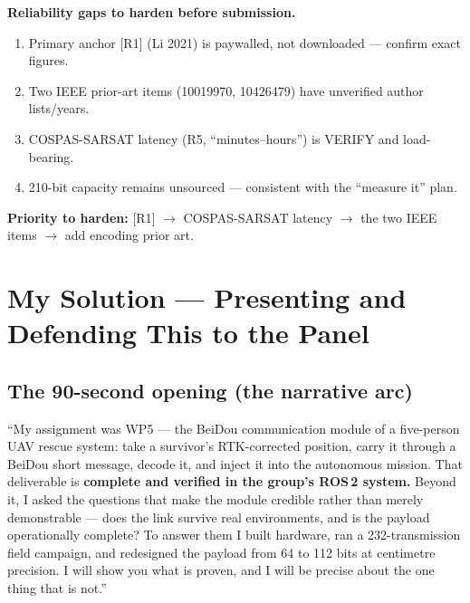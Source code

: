 \documentclass[11pt,a4paper]{article}
\begin{document}
\textbf{Reliability gaps to harden before submission.}
\begin{enumerate}[leftmargin=1.6em,itemsep=1pt]
  \item Primary anchor [R1] (Li 2021) is paywalled, not downloaded --- confirm exact figures.
  \item Two IEEE prior-art items (10019970, 10426479) have unverified author lists/years.
  \item COSPAS-SARSAT latency (R5, ``minutes--hours'') is VERIFY and load-bearing.
  \item 210-bit capacity remains unsourced --- consistent with the ``measure it'' plan.
\end{enumerate}

\textbf{Priority to harden:} [R1] $\to$ COSPAS-SARSAT latency $\to$ the two IEEE items
$\to$ add encoding prior art.

\section{My Solution --- Presenting and Defending This to the Panel}

\subsection{The 90-second opening (the narrative arc)}
\begin{callout}
``My assignment was WP5 --- the BeiDou communication module of a five-person UAV rescue
system: take a survivor's RTK-corrected position, carry it through a BeiDou short message,
decode it, and inject it into the autonomous mission. That deliverable is \textbf{complete
and verified in the group's ROS\,2 system.} Beyond it, I asked the questions that make the
module credible rather than merely demonstrable --- does the link survive real environments,
and is the payload operationally complete? To answer them I built hardware, ran a
232-transmission field campaign, and redesigned the payload from 64 to 112 bits at
centimetre precision. I will show you what is proven, and I will be precise about the one
thing that is not.''
\end{callout}
\end{document}
